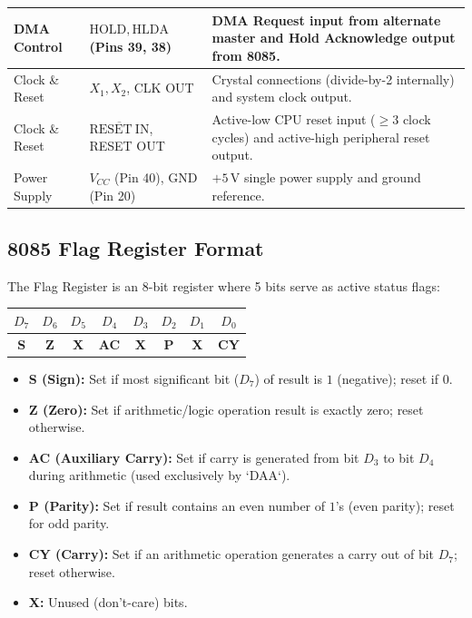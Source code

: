 \documentclass[12pt,a4paper]{article}
\begin{document}
\begin{longtable}{|B{2.8cm}|B{2.8cm}|>{\small\raggedright\arraybackslash}m{\dimexpr(\linewidth-2.8cm-2.8cm-6\arrayrulewidth)/1\relax}|}
DMA Control & $\mathrm{HOLD}, \mathrm{HLDA}$ (Pins 39, 38) & DMA Request input from alternate master and Hold Acknowledge output from 8085. \\ \hline
Clock \& Reset & $X_1, X_2$, CLK OUT & Crystal connections (divide-by-2 internally) and system clock output. \\ \hline
Clock \& Reset & $\overline{\mathrm{RESET\ IN}}$, RESET OUT & Active-low CPU reset input ($\ge 3$ clock cycles) and active-high peripheral reset output. \\ \hline
Power Supply & $V_{CC}$ (Pin 40), GND (Pin 20) & $+5\,\mathrm{V}$ single power supply and ground reference. \\ \hline
\end{longtable}
\endgroup\par
\endgroup

\subsection{8085 Flag Register Format}
\begin{tcolorbox}[formulabox, title={8085 Flag Register (8-Bit)}]
The Flag Register is an 8-bit register where 5 bits serve as active status flags:
\par\vspace{3pt}
\centering
\begin{tabular}{|c|c|c|c|c|c|c|c|}
\hline
\textbf{$D_7$} & \textbf{$D_6$} & \textbf{$D_5$} & \textbf{$D_4$} & \textbf{$D_3$} & \textbf{$D_2$} & \textbf{$D_1$} & \textbf{$D_0$} \\ \hline
\textbf{S} & \textbf{Z} & \textbf{X} & \textbf{AC} & \textbf{X} & \textbf{P} & \textbf{X} & \textbf{CY} \\ \hline
\end{tabular}
\par\vspace{3pt}\raggedright
\begin{itemize}[leftmargin=*, itemsep=1pt]
  \item \textbf{S (Sign):} Set if most significant bit ($D_7$) of result is $1$ (negative); reset if $0$.
  \item \textbf{Z (Zero):} Set if arithmetic/logic operation result is exactly zero; reset otherwise.
  \item \textbf{AC (Auxiliary Carry):} Set if carry is generated from bit $D_3$ to bit $D_4$ during arithmetic (used exclusively by `DAA`).
  \item \textbf{P (Parity):} Set if result contains an even number of $1$'s (even parity); reset for odd parity.
  \item \textbf{CY (Carry):} Set if an arithmetic operation generates a carry out of bit $D_7$; reset otherwise.
  \item \textbf{X:} Unused (don't-care) bits.
\end{itemize}
\end{tcolorbox}
\end{document}

